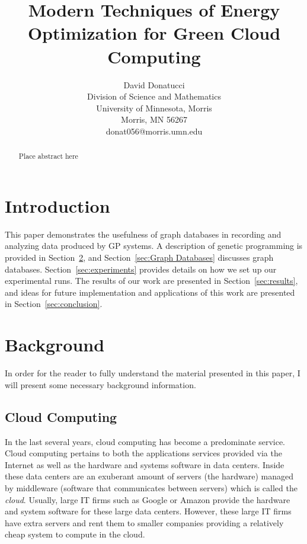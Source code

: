 \documentclass[12pt]{article}
\title{Modern Techniques of Energy Optimization for Green Cloud Computing}
\author{
 		David Donatucci\\
        Division of Science and Mathematics\\
        University of Minnesota, Morris\\
        Morris, MN 56267\\
        donat056@morris.umn.edu\\
}
\date{}
\begin{document}
\pagestyle{plain}

\maketitle

\begin{abstract}

Place abstract here

\end{abstract}

\section{Introduction} \label{sec:intro}

This paper demonstrates the usefulness of graph databases in recording and analyzing data produced by GP systems. A description of genetic programming is provided in Section~\ref{Background}, and Section~\ref{sec:Graph Databases} discusses graph databases. Section~\ref{sec:experiments} provides details on how we set up our experimental runs. The results of our work are presented in Section~\ref{sec:results}, and ideas for future implementation and applications of this work are presented in Section~\ref{sec:conclusion}.

\section{Background} \label{Background}

In order for the reader to fully understand the material presented in this paper, I will present some necessary background information.

\subsection{Cloud Computing}
\label{sec:Cloud Computing}

In the last several years, cloud computing has become a predominate service. Cloud computing pertains to both the applications services provided via the Internet as well as the hardware and systems software in data centers. Inside these data centers are an exuberant amount of servers (the hardware) managed by middleware (software that communicates between servers) which is called the \emph{cloud}.  Usually, large IT firms such as Google or Amazon provide the hardware and system software for these large data centers. However, these large IT firms have extra servers and rent them to smaller companies providing a relatively cheap system to compute in the cloud. 
\end{document}

